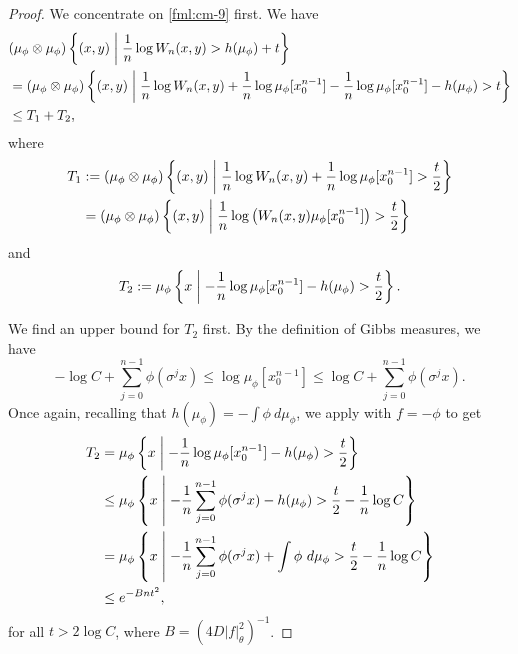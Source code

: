\begin{theorem}
	\begin{proof}
		We concentrate on \eqref{fml:cm-9} first. We have
		\begin{align*}
			&(\mu_\phi \otimes \mu_\phi)\left\{(x, y) \midmid \frac{1}{n}\log{W_n(x, y)} > h(\mu_\phi) + t\right\} \\
				&= (\mu_\phi \otimes \mu_\phi)\left\{(x, y) \midmid \frac{1}{n}\log{W_n(x, y)} + \frac{1}{n}\log{\mu_\phi[x_0^{n - 1}]} - \frac{1}{n}\log{\mu_\phi[x_0^{n - 1}]} - h(\mu_\phi) > t\right\} \\
				&\leq T_1 + T_2, %
		\end{align*}
		where
		\begin{align*}
			T_1 &:= (\mu_\phi \otimes \mu_\phi)\left\{(x, y) \mathrel{}\middle|\mathrel{} \frac{1}{n}\log{W_n(x, y)} + \frac{1}{n}\log{\mu_\phi[x_0^{n - 1}]} > \frac{t}{2}\right\} \\
				&= (\mu_\phi \otimes \mu_\phi)\left\{(x, y) \mathrel{}\middle|\mathrel{} \frac{1}{n}\log\left(W_n(x, y) \mu_\phi[x_0^{n - 1}]\right) > \frac{t}{2}\right\}
		\end{align*}
		and
		\[
			T_2 := \mu_\phi\left\{x \mathrel{}\middle|\mathrel{} - \frac{1}{n}\log{\mu_\phi[x_0^{n - 1}]} - h(\mu_\phi) > \frac{t}{2}\right\}.
		\]
		
		We find an upper bound for $T_2$ first. By the definition of Gibbs measures, we have
		\begin{equation}\label{fml:gibbs-property}
			-\log{C} + \sum_{j = 0}^{n - 1}{\phi(\sigma^j{x})} \leq \log{\mu_\phi[x_0^{n - 1}]} \leq \log{C} + \sum_{j = 0}^{n - 1}{\phi(\sigma^j{x})}.
		\end{equation}
		Once again, recalling that $h(\mu_\phi) = -\int{\phi\ d\mu_\phi}$, we apply  with $f = -\phi$ to get
		\begin{align*}
			T_2 &= \mu_\phi\left\{x \mathrel{}\middle|\mathrel{} - \frac{1}{n}\log{\mu_\phi[x_0^{n - 1}]} - h(\mu_\phi) > \frac{t}{2}\right\} \\
				&\leq \mu_\phi\left\{x \mathrel{}\middle|\mathrel{} -\frac{1}{n}\sum_{j = 0}^{n - 1}{\phi(\sigma^j{x})} -h(\mu_\phi) > \frac{t}{2} -\frac{1}{n}\log{C}\right\} \\
				&= \mu_\phi\left\{x \mathrel{}\middle|\mathrel{} -\frac{1}{n}\sum_{j = 0}^{n - 1}{\phi(\sigma^j{x})} + \int{\phi\ d\mu_\phi} > \frac{t}{2} -\frac{1}{n}\log{C}\right\} \\
				& \leq e^{-Bnt^2},
		\end{align*}
		for all $t > 2\log{C}$, where $B = (4D|f|_\theta^2)^{-1}$.
		

\end{proof}
\end{theorem}
